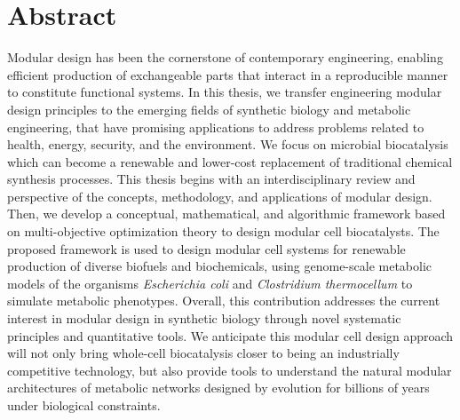 \chapter*{Abstract}\label{ch:abstract}
Modular design has been the cornerstone of contemporary engineering, enabling efficient production of exchangeable parts that interact in a reproducible manner to constitute functional systems.
    In this thesis, we transfer engineering modular design principles to the emerging fields of synthetic biology and metabolic engineering, that have promising applications to address problems related to health, energy, security, and the environment.
    We focus on microbial biocatalysis which can become a renewable and lower-cost replacement of traditional chemical synthesis processes.
    This thesis begins with an interdisciplinary review and perspective of the concepts, methodology, and applications of modular design.
    Then, we develop a conceptual, mathematical, and algorithmic framework based on multi-objective optimization theory to design modular cell biocatalysts.
    The proposed framework is used to design modular cell systems for renewable production of diverse biofuels and biochemicals, using
    genome-scale metabolic models of the organisms \textit{Escherichia coli} and \textit{Clostridium thermocellum} to simulate metabolic phenotypes.
    Overall, this contribution addresses the current interest in modular design in synthetic biology through novel systematic principles and quantitative tools.
    We anticipate this modular cell design approach will not only bring whole-cell biocatalysis closer to being an industrially competitive technology, but also provide tools to understand the natural modular architectures of metabolic networks designed by evolution for billions of years under biological constraints.
